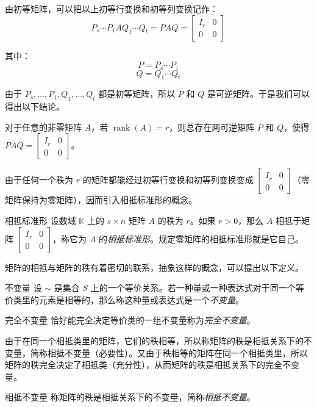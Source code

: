 由初等矩阵，可以把以上初等行变换和初等列变换记作：
$$
P_s \cdots P_1 A Q_1 \cdots Q_t = PAQ = \begin{bmatrix} I_r & 0 \\ 0 & 0 \end{bmatrix}
$$

其中：
$$
P = P_s \cdots P_1
$$$$
Q = Q_1 \cdots Q_t
$$

由于 $P_s, \ldots, P_1, Q_1, \ldots, Q_t$ 都是初等矩阵，所以 $P$ 和 $Q$ 是可逆矩阵。于是我们可以得出以下结论。

\begin{theorem}
	对于任意的非零矩阵 $A$，若 $\operatorname{rank}(A) = r$，则总存在两可逆矩阵 $P$ 和 $Q$，使得 $PAQ = \begin{bmatrix} I_r & 0 \\ 0 & 0 \end{bmatrix}$。
\end{theorem}

由于任何一个秩为 $r$ 的矩阵都能经过初等行变换和初等列变换变成 $\begin{bmatrix} I_r & 0 \\ 0 & 0 \end{bmatrix}$（零矩阵保持为零矩阵），因而引入相抵标准形的概念。

\begin{definition}{相抵标准形}
	设数域 $\mathbb K$ 上的 $s \times n$ 矩阵 $A$ 的秩为 $r$。如果 $r > 0$，那么 $A$ 相抵于矩阵 $\begin{bmatrix} I_r & 0 \\ 0 & 0 \end{bmatrix}$，称它为 $A$ 的\emph{相抵标准形}。规定零矩阵的相抵标准形就是它自己。
\end{definition}

矩阵的相抵与矩阵的秩有着密切的联系，抽象这样的概念，可以提出以下定义。

\begin{definition}{不变量}
	设 $\sim$ 是集合 $S$ 上的一个等价关系。若一种量或一种表达式对于同一个等价类里的元素是相等的，那么称这种量或表达式是一个\emph{不变量}。
\end{definition}

\begin{definition}{完全不变量}
	恰好能完全决定等价类的一组不变量称为\emph{完全不变量}。
\end{definition}

由于在同一个相抵类里的矩阵，它们的秩相等，所以称矩阵的秩是相抵关系下的不变量，简称相抵不变量（必要性）。又由于秩相等的矩阵在同一个相抵类里，所以矩阵的秩完全决定了相抵类（充分性），从而矩阵的秩是相抵关系下的完全不变量。

\begin{definition}{相抵不变量}
	称矩阵的秩是相抵关系下的不变量，简称\emph{相抵不变量}。
\end{definition}

